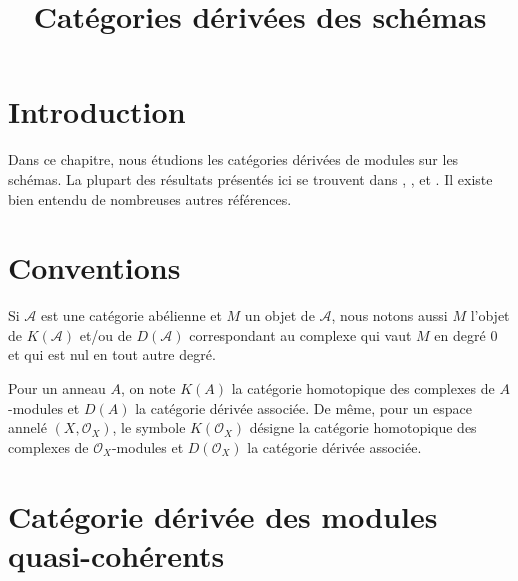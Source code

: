 

%


\title{Catégories dérivées des schémas}


\maketitle

\label{section-phantom}

\tableofcontents

\section{Introduction}
\label{section-introduction}

\noindent
Dans ce chapitre, nous étudions les catégories dérivées de modules sur les schémas.
La plupart des résultats présentés ici se trouvent dans
\cite{TT}, \cite{Bokstedt-Neeman}, \cite{BvdB} et \cite{LN}.
Il existe bien entendu de nombreuses autres références.


\section{Conventions}
\label{section-conventions}

\noindent
Si $\mathcal{A}$ est une catégorie abélienne et $M$ un objet
de $\mathcal{A}$, nous notons aussi $M$ l'objet de $K(\mathcal{A})$
et/ou de $D(\mathcal{A})$ correspondant au complexe qui vaut
$M$ en degré $0$ et qui est nul en tout autre degré.

\medskip\noindent
Pour un anneau $A$, on note $K(A)$ la catégorie homotopique
des complexes de $A$-modules et $D(A)$ la catégorie dérivée associée.
De même, pour un espace annelé $(X, \mathcal{O}_X)$, le symbole
$K(\mathcal{O}_X)$ désigne la catégorie homotopique des complexes de
$\mathcal{O}_X$-modules et $D(\mathcal{O}_X)$ la catégorie dérivée
associée.










\section{Catégorie dérivée des modules quasi-cohérents}
\label{section-derived-quasi-coherent}

